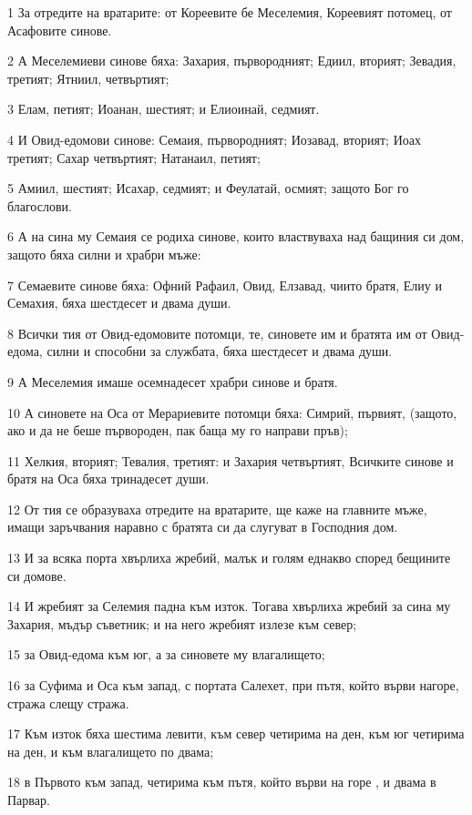 \par 1 За отредите на вратарите: от Кореевите бе Меселемия, Кореевият потомец, от Асафовите синове.
\par 2 А Меселемиеви синове бяха: Захария, първородният; Едиил, вторият; Зевадия, третият; Ятниил, четвъртият;
\par 3 Елам, петият; Иоанан, шестият; и Елиоинай, седмият.
\par 4 И Овид-едомови синове: Семаия, първородният; Иозавад, вторият; Иоах третият; Сахар четвъртият; Натанаил, петият;
\par 5 Амиил, шестият; Исахар, седмият; и Феулатай, осмият; защото Бог го благослови.
\par 6 А на сина му Семаия се родиха синове, които властвуваха над бащиния си дом, защото бяха силни и храбри мъже:
\par 7 Семаевите синове бяха: Офний Рафаил, Овид, Елзавад, чиито братя, Елиу и Семахия, бяха шестдесет и двама души.
\par 8 Всички тия от Овид-едомовите потомци, те, синовете им и братята им от Овид-едома, силни и способни за службата, бяха шестдесет и двама души.
\par 9 А Меселемия имаше осемнадесет храбри синове и братя.
\par 10 А синовете на Оса от Мерариевите потомци бяха: Симрий, първият, (защото, ако и да не беше първороден, пак баща му го направи пръв);
\par 11 Хелкия, вторият; Тевалия, третият: и Захария четвъртият, Всичките синове и братя на Оса бяха тринадесет души.
\par 12 От тия се образуваха отредите на вратарите, ще каже на главните мъже, имащи заръчвания наравно с братята си да слугуват в Господния дом.
\par 13 И за всяка порта хвърлиха жребий, малък и голям еднакво според бещините си домове.
\par 14 И жребият за Селемия падна към изток. Тогава хвърлиха жребий за сина му Захария, мъдър съветник; и на него жребият излезе към север;
\par 15 за Овид-едома към юг, а за синовете му влагалището;
\par 16 за Суфима и Оса към запад, с портата Салехет, при пътя, който върви нагоре, стража слещу стража.
\par 17 Към изток бяха шестима левити, към север четирима на ден, към юг четирима на ден, и към влагалището по двама;
\par 18 в Първото към запад, четирима към пътя, който върви на горе , и двама в Парвар.

